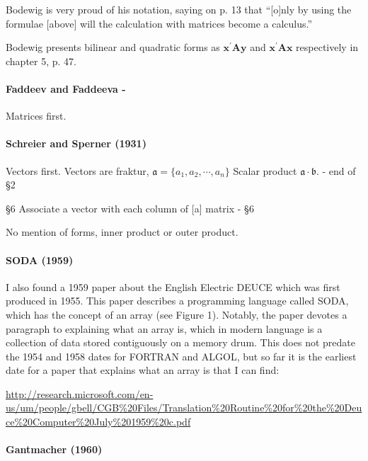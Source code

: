 Bodewig is very proud of his notation, saying on p. 13 that
``[o]nly by using the formulae [above] will the calculation with matrices become a calculus.''

Bodewig presents bilinear and quadratic forms as $\mathbf{x^\prime A y}$ and
$\mathbf{x^\prime A x}$ respectively in chapter 5, p. 47.



\paragraph{Faddeev and Faddeeva - \cite{Faddeev1959}}

Matrices first.



\paragraph{Schreier and Sperner (1931)~\cite{Schreier1931}}

Vectors first.
Vectors are fraktur, $\mathfrak a = \{a_1, a_2, \cdots, a_n\}$
Scalar product $\mathfrak a \cdot \mathfrak b$. - end of \S 2

\S6 Associate a vector with each column of [a] matrix - \S 6

No mention of forms, inner product or outer product.


\paragraph{SODA (1959)}

I also found a 1959 paper about the English Electric DEUCE which
was first produced in 1955. This paper describes a programming
language called SODA, which has the concept of an array (see Figure
1). Notably, the paper devotes a paragraph to explaining what an array
is, which in modern language is a collection of data stored
contiguously on a memory drum. This does not predate the 1954 and 1958
dates for FORTRAN and ALGOL, but so far it is the earliest date for a
paper that explains what an array is that I can find:

\url{http://research.microsoft.com/en-us/um/people/gbell/CGB%20Files/Translation%20Routine%20for%20the%20Deuce%20Computer%20July%201959%20c.pdf}




\paragraph{Gantmacher (1960)~\cite{Gantmacher1960}}

